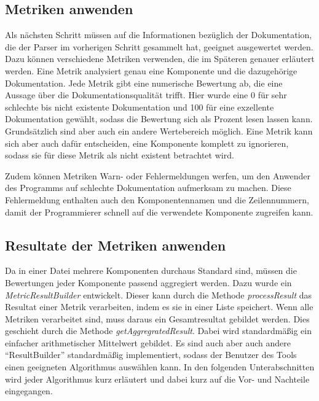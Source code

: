 \subsection{Metriken anwenden}
Als nächsten Schritt müssen auf die Informationen bezüglich der Dokumentation, die der Parser im vorherigen Schritt gesammelt hat, geeignet ausgewertet werden. Dazu können verschiedene Metriken verwenden, die im Späteren genauer erläutert werden. Eine Metrik analysiert genau eine Komponente und die dazugehörige Dokumentation. Jede Metrik gibt eine numerische Bewertung  ab, die eine Aussage über die Dokumentationsqualität trifft. Hier wurde eine 0 für sehr schlechte bis nicht existente Dokumentation und 100 für eine exzellente Dokumentation gewählt, sodass die Bewertung sich als Prozent lesen lassen kann. Grundsätzlich sind aber auch ein andere Wertebereich möglich. Eine Metrik kann sich aber auch dafür entscheiden, eine Komponente komplett zu ignorieren, sodass sie für diese Metrik als nicht existent betrachtet wird.

Zudem können Metriken Warn- oder Fehlermeldungen werfen, um den Anwender des Programms auf schlechte Dokumentation aufmerksam zu machen. Diese Fehlermeldung enthalten auch den Komponentennamen und die Zeilennummern, damit der Programmierer schnell auf die verwendete Komponente zugreifen kann.\bigskip
\subsection{Resultate der Metriken anwenden}
Da in einer Datei mehrere Komponenten durchaus Standard sind, müssen die Bewertungen jeder Komponente passend aggregiert werden. Dazu wurde ein \textit{MetricResultBuilder} entwickelt. Dieser kann durch die Methode \textit{processResult} das Resultat einer Metrik verarbeiten, indem es sie in einer Liste speichert. Wenn alle Metriken verarbeitet sind, muss daraus ein Gesamtresultat gebildet werden. Dies geschieht durch die Methode \textit{getAggregratedResult}. Dabei wird standardmäßig ein einfacher arithmetischer Mittelwert gebildet. Es sind auch aber auch andere \enquote{ResultBuilder} standardmäßig implementiert, sodass der Benutzer des Tools einen geeigneten Algorithmus auswählen kann. In den folgenden Unterabschnitten wird jeder Algorithmus kurz erläutert und dabei kurz auf die Vor- und Nachteile eingegangen. 
